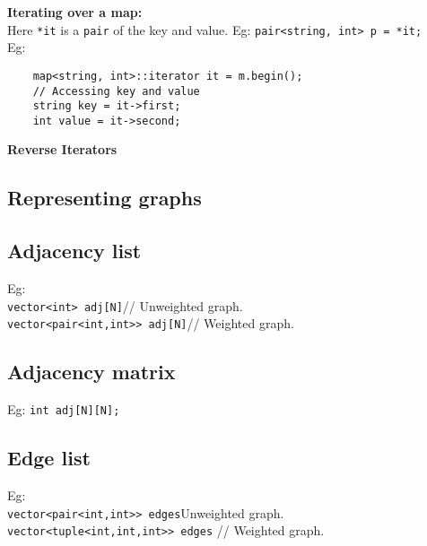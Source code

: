 \begin{minipage}{\linewidth}
\textbf{Iterating over a map:}\\
Here \texttt{*it} is a \texttt{pair} of the key and value.
Eg: \texttt{pair<string, int> p = *it;}\\
Eg:
\begin{verbatim}
    map<string, int>::iterator it = m.begin();
    // Accessing key and value
    string key = it->first;
    int value = it->second;
\end{verbatim}

\textbf{Reverse Iterators}

\subsection{Representing graphs}

\subsection{Adjacency list}
Eg:\\
\texttt{vector<int> adj[N]}// Unweighted graph.\\
\texttt{vector<pair<int,int>> adj[N]}// Weighted graph.\\

\subsection{Adjacency matrix}

Eg: \texttt{int adj[N][N];}

\subsection{Edge list}

Eg:\\
\texttt{vector<pair<int,int>> edges}Unweighted graph.\\
\texttt{vector<tuple<int,int,int>> edges} // Weighted graph.\\

\end{minipage}
